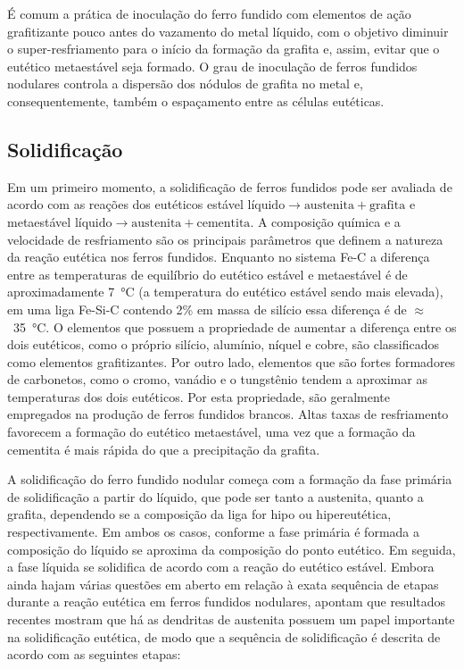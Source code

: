 É comum a prática de inoculação do ferro fundido com elementos de ação grafitizante pouco antes do vazamento do metal líquido, com o objetivo diminuir o super-resfriamento para o início da formação da grafita e, assim, evitar que o eutético metaestável seja formado\cite{Santos1989}. O grau de inoculação de ferros fundidos nodulares controla a dispersão dos nódulos de grafita no metal e, consequentemente, também o espaçamento entre as células eutéticas.

\subsection{Solidificação}

Em um primeiro momento, a solidificação de ferros fundidos pode ser avaliada de acordo com as reações dos eutéticos estável $\text{líquido} \rightarrow \text{austenita} + \text{grafita}$ e metaestável $\text{líquido} \rightarrow \text{austenita} + \text{cementita}$. A composição química e a velocidade de resfriamento são os principais parâmetros que definem a natureza da reação eutética nos ferros fundidos. Enquanto no sistema Fe-C a diferença entre as temperaturas de equilíbrio do eutético estável e metaestável é de aproximadamente \SI{7}{\degreeCelsius} (a temperatura do eutético estável sendo mais elevada), em uma liga Fe-Si-C contendo 2\% em massa de silício essa diferença é de $\approx$~\SI{35}{\degreeCelsius}\cite{Santos1989}. O elementos que possuem a propriedade de aumentar a diferença entre os dois eutéticos, como o próprio silício, alumínio, níquel e cobre, são classificados como elementos grafitizantes. Por outro lado, elementos que são fortes formadores de carbonetos, como o cromo, vanádio e o tungstênio tendem a aproximar as temperaturas dos dois eutéticos. Por esta propriedade, são geralmente empregados na produção de ferros fundidos brancos. Altas taxas de resfriamento favorecem a formação do eutético metaestável, uma vez que a formação da cementita é mais rápida do que a precipitação da grafita.

A solidificação do ferro fundido nodular começa com a formação da fase primária de solidificação a partir do líquido, que pode ser tanto a austenita, quanto a grafita, dependendo se a composição da liga for hipo ou hipereutética, respectivamente. Em ambos os casos, conforme a fase primária é formada a composição do líquido se aproxima da composição do ponto eutético. Em seguida, a fase líquida se solidifica de acordo com a reação do eutético estável. Embora ainda hajam várias questões em aberto em relação à exata sequência de etapas durante a reação eutética em ferros fundidos nodulares,  apontam que resultados recentes mostram que há as dendritas de austenita possuem um papel importante na solidificação eutética, de modo que a sequência de solidificação é descrita de acordo com as seguintes etapas:

